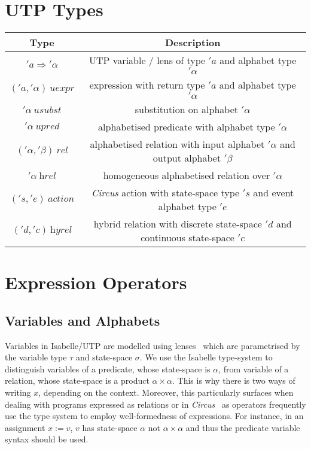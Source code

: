 \documentclass[11pt]{article}
\newcommand{\Circus}{\hbox{\textsf{\textsl{Circus}}}\xspace}
\begin{document}
\newpage

\section{UTP Types}

\begin{center}
\begin{tabular}{|c|c|} \hline
  \textbf{Type}                   & \textbf{Description} \\ \hline
  $'a \Longrightarrow {}'\alpha$    & UTP variable / lens of type $'a$ and alphabet type $'\alpha$ \\
  $('a, {}'\alpha)~\textit{uexpr}$  & expression with return type $'a$ and alphabet type $'\alpha$ \\
  $'\alpha~\textit{usubst}$       & substitution on alphabet $'\alpha$ \\
  $'\alpha~\textit{upred}$        & alphabetised predicate with alphabet type $'\alpha$ \\
  $('\alpha,{}'\beta)~\textit{rel}$ & alphabetised relation with input alphabet $'\alpha$ and output alphabet $'\beta$ \\
  $'\alpha~\textit{hrel}$         & homogeneous alphabetised relation over $'\alpha$ \\
  $('s, {}'e)~\textit{action}$      & \Circus action with state-space type $'s$ and event alphabet type $'e$ \\
  $('d, {}'c)~\textit{hyrel}$       & hybrid relation with discrete state-space $'d$ and continuous state-space $'c$ \\
  \hline
\end{tabular}
\end{center}

\section{Expression Operators}

\subsection{Variables and Alphabets}

Variables in Isabelle/UTP are modelled using lenses~\cite{Foster16a,Foster17a,Foster17b} which are parametrised by the
variable type $\tau$ and state-space $\sigma$.  We use the Isabelle type-system to distinguish variables of a predicate,
whose state-space is $\alpha$, from variable of a relation, whose state-space is a product $\alpha \times \alpha$. This
is why there is two ways of writing $x$, depending on the context. Moreover, this particularly surfaces when dealing
with programs expressed as relations or in \Circus~\cite{Oliveira&09} as operators frequently use the type system to
employ well-formedness of expressions. For instance, in an assignment $x := v$, $v$ has state-space $\alpha$ not
$\alpha \times \alpha$ and thus the predicate variable syntax should be used.
\end{document}
